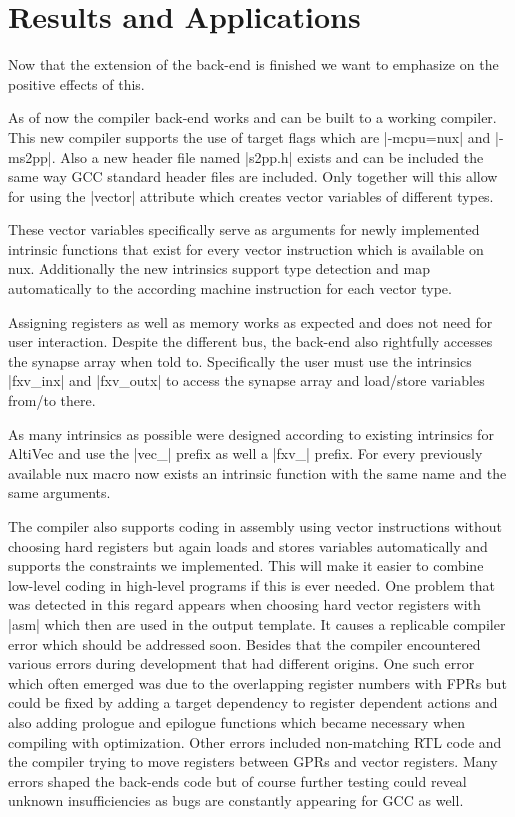 \chapter{Results and Applications}
\label{chapter:results}

Now that the extension of the back-end is finished we want to emphasize on the positive effects of this.

As of now the compiler back-end works and can be built to a working compiler.
This new compiler supports the use of target flags which are |-mcpu=nux| and |-ms2pp|.
Also a new header file named |s2pp.h| exists and can be included the same way GCC standard header files are included.
Only together will this allow for using the |vector| attribute which creates vector variables of different types.

These vector variables specifically serve as arguments for newly implemented intrinsic functions that exist for every vector instruction which is available on nux.
Additionally the new intrinsics support type detection and map automatically to the according machine instruction for each vector type.

Assigning registers as well as memory works as expected and does not need for user interaction.
Despite the different bus, the back-end also rightfully accesses the synapse array when told to.
Specifically the user must use the intrinsics |fxv_inx| and |fxv_outx| to access the synapse array and load/store variables from/to there.

As many intrinsics as possible were designed according to existing intrinsics for AltiVec and use the |vec_| prefix as well a |fxv_| prefix.
For every previously available nux macro now exists an intrinsic function with the same name and the same arguments.

The compiler also supports coding in assembly using vector instructions without choosing hard registers but again loads and stores variables automatically and supports the constraints we implemented.
This will make it easier to combine low-level coding in high-level programs if this is ever needed.
One problem that was detected in this regard appears when choosing hard vector registers with |asm| which then are used in the output template.
It causes a replicable compiler error which should be addressed soon.
Besides that the compiler encountered various errors during development that had different origins.
One such error which often emerged was due to the overlapping register numbers with FPRs but could be fixed by adding a target dependency to register dependent actions and also adding prologue and epilogue functions which became necessary when compiling with optimization.
Other errors included non-matching RTL code and the compiler trying to move registers between GPRs and vector registers.
Many errors shaped the back-ends code but of course further testing could reveal unknown insufficiencies as bugs are constantly appearing for GCC as well.

